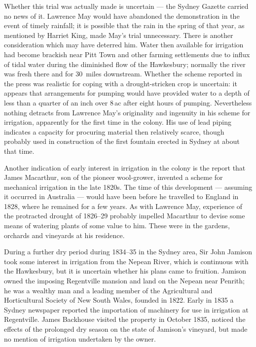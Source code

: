 Whether this trial was actually made is uncertain --- the Sydney
Gazette carried no news of it.  Lawrence May would have abandoned the
demonstration in the event of timely rainfall; it is possible that the
rain in the spring of that year, as mentioned by Harriet King, made
May's trial unnecessary.  There is another consideration which may
have deterred him.  Water then available for irrigation had become
brackish near Pitt Town and other farming settlements due to influx of
tidal water during the diminished flow of the Hawkesbury; normally the
river was fresh there and for 30~miles downstream.  Whether the scheme reported in the press was
realistic for coping with a drought-stricken crop is uncertain: it
appears that arrangements for pumping would have provided water to a
depth of less than a quarter of an inch over 8\,ac after eight hours
of pumping.  Nevertheless nothing detracts from Lawrence May's
originality and ingenuity in his scheme for irrigation, apparently for
the first time in the colony.  His use of lead piping indicates a
capacity for procuring material then relatively scarce, though
probably used in construction of the first fountain erected in Sydney
at about that time.

Another indication of early interest in irrigation in the colony is
the report that James Mac\-ar\-th\-ur, son of the pioneer wool-grower,
invented a scheme for mechanical irrigation in the late 1820s.  The
time of this development --- assuming it occurred in Australia ---
would have been before he travelled to England in 1828, where he
remained for a few years.  As with Lawrence May, experience of the
protracted drought of 1826--29 probably impelled Macarthur to devise
some means of watering plants of some value to him.  These were in the
gardens, orchards and vineyards at his
residence.

During a further dry period during 1834--35 in the Sydney area, Sir
John Jamison took some interest in irrigation from the Nepean River,
which is continuous with the Hawkesbury, but it is uncertain whether
his plans came to fruition.  Jamison owned the imposing Regentville
mansion and land on the Nepean near Penrith; he was a wealthy man and
a leading member of the Agricultural and Horticultural Society of New
South Wales, founded in 1822.  Early in 1835 a Sydney newspaper
reported the importation of machinery for use in irrigation at
Regentville.  James Backhouse visited the property in October 1835,
noticed the effects of the prolonged dry season on the state of
Jamison's vineyard, but made no mention of irrigation undertaken by
the owner.

